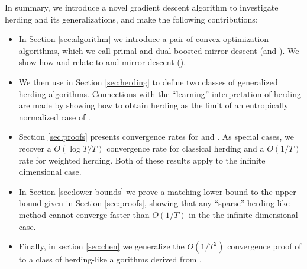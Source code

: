 \documentclass[paper.tex]{subfiles}
\begin{document}

In summary, we introduce a novel gradient descent algorithm to investigate herding and its generalizations, and make the following contributions:
\begin{itemize}
\item In Section \ref{sec:algorithm} we introduce a pair of convex optimization algorithms, which we call primal and dual boosted mirror descent (\primal and \dual). We show how \primal and \dual relate to \cgd and mirror descent (\md). 
\item We then use \dual in Section \ref{sec:herding} to define two classes of generalized herding algorithms. Connections with the ``learning'' interpretation of herding are made by showing how to obtain herding as the limit of an entropically normalized case of \dual. 
\item Section \ref{sec:proofs} presents convergence rates for \primal and \dual. As special cases, we recover a $O(\log T/ T)$ convergence rate for classical herding and a $O(1/T)$ rate for weighted herding. Both of these results apply to the infinite dimensional case. 
\item In Section \ref{sec:lower-bounds} we prove a matching lower bound to the upper bound given in Section \ref{sec:proofs}, showing that any ``sparse'' herding-like method cannot converge faster than $O(1/T)$ in the the infinite dimensional case.%
\item Finally, in section \ref{sec:chen} we generalize the $O(1/T^{2})$ convergence proof of \citet{Chen:2010a} to a class of herding-like algorithms derived from \bmd. 
\end{itemize}
\end{document}
